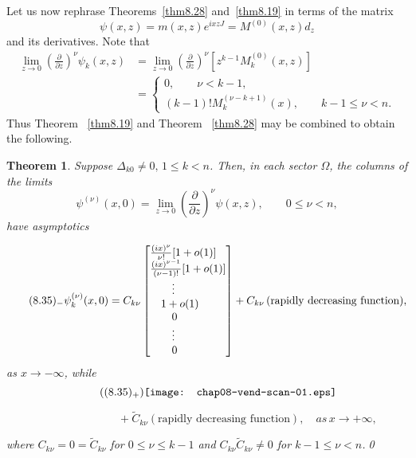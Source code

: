 \documentclass{surv-l}
\theoremstyle{plain}
\newtheorem{theorem}{Theorem}[section]
\theoremstyle{definition}
\numberwithin{equation}{chapter}
\begin{document}
Let us now rephrase Theorems~\ref{thm8.28} and~\ref{thm8.19} in terms of the matrix
\begin{equation*}
\psi(x, z)=m(x, z)e^{ixzJ}=M^{(0)}(x,z)d_{z}
\end{equation*}
and its derivatives. Note that
\begin{align*}
\lim_{z\rightarrow 0}\left(\frac{\partial}{\partial z}\right)^{\nu}\psi_{k}(x, z)&=\lim_{z\rightarrow 0}\left(\frac{\partial}{\partial z}\right)^{\nu} [z^{k-1}M_{k}^{(0)}(x, z)]\\
&=\left\{\begin{array}{ll}
0, \qquad \nu < k - 1,\\
(k -1)!M_{k}^{(\nu-k+1)}(x),\qquad k -1 \leq \nu < n.
\end{array}\right.
\end{align*}
Thus Theorem ~\ref{thm8.19} and Theorem ~\ref{thm8.28} may be combined to obtain the following.

\setcounter{theorem}{33}
\begin{theorem}\label{thm8.34} Suppose $\Delta_{k0}\neq 0,\,1\leq k < n$. Then, in each sector $\Omega$, the
columns of the limits
\begin{equation*}
\psi^{(\nu)}(x,0) = \lim_{z\rightarrow 0}\left(\frac{\partial}{\partial z}\right)^{\nu} \psi(x,z),\qquad 0 \leq \nu < n,
\end{equation*}
have asymptotics

\begin{align*}
\tag*{$(8.35)_{-}$} \psi_{k}^{(\nu)}(x, 0)= C_{k\nu} \left[\begin{array}{@{}l@{}}
\frac{(ix)^{\nu}}{\nu!}[1+o(1)]\\
\frac{(ix)^{\nu- 1}}{(\nu-1)!}[1 + o(1)]\\
\qquad\vdots\\
\quad 1 + o(1)\\
\qquad 0\\
\qquad\vdots\\
\qquad 0
\end{array}\right] +C_{k\nu}\, (\text{rapidly decreasing function}),
\end{align*}
as $x \rightarrow-\infty$, while
\begin{equation*}
\tag{$(8.35)_{+}$}
\texttt{[image: chap08-vend-scan-01.eps]}
\end{equation*}

$\qquad\qquad\qquad\qquad\qquad+\tilde{C}_{k\nu} (\text{rapidly decreasing function}),\quad as\, x\rightarrow +\infty,$

where $C_{k\nu}=0=\tilde{C}_{k\nu}$ for $ 0\leq\nu \leq k-1$ and $C_{k\nu}\tilde{C}_{k\nu}\neq 0$ for $k-1 \leq\nu <n$.\qed
\end{theorem}
\end{document}
